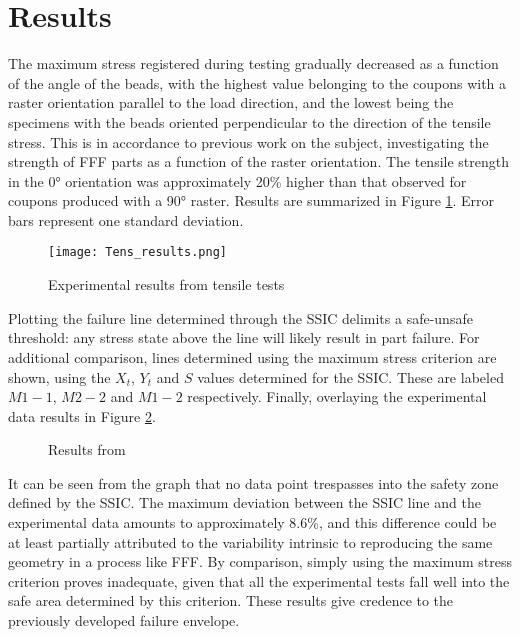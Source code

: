 \documentclass[main.tex]{subfiles}
\begin{document}
\section{Results}\label{sec:results_ssic}

The maximum stress registered during testing gradually decreased as a function of the angle of the beads, with the highest value belonging to the coupons with a raster orientation parallel to the load direction, and the lowest being the specimens with the beads oriented perpendicular to the direction of the tensile stress. This is in accordance to previous work on the subject, investigating the strength of FFF parts as a function of the raster orientation. The tensile strength in the 0° orientation was approximately 20\% higher than that observed for coupons produced with a 90° raster. Results are summarized in Figure \ref{fig:ssic_tens}. Error bars represent one standard deviation.

\begin{figure}[!htbp]
	\center
	\texttt{[image: Tens\_results.png]}
	\caption{Experimental results from tensile tests}
	\label{fig:ssic_tens}
\end{figure}

Plotting the failure line determined through the SSIC delimits a safe-unsafe threshold: any stress state above the line will likely result in part failure.  For additional comparison, lines determined using the maximum stress criterion are shown, using the $X_t$, $Y_t$ and $S$ values determined for the SSIC. These are labeled $M1-1$, $M2-2$ and $M1-2$ respectively. Finally, overlaying the experimental data results in Figure \ref{fig:jcompscir}.

\begin{figure}[!htbp]
	\center
	\hfill
	\caption{Results from \cite{MazzeiJCompSci}} \label{fig:jcompscir}
\end{figure} 

It can be seen from the graph that no data point trespasses into the safety zone defined by the SSIC. The maximum deviation between the SSIC line and the experimental data amounts to approximately 8.6\%, and this difference could be at least partially attributed to the variability intrinsic to reproducing the same geometry in a process like FFF. By comparison, simply using the maximum stress criterion proves inadequate, given that all the experimental tests fall well into the safe area determined by this criterion. These results give credence to the previously developed failure envelope.
\end{document}
